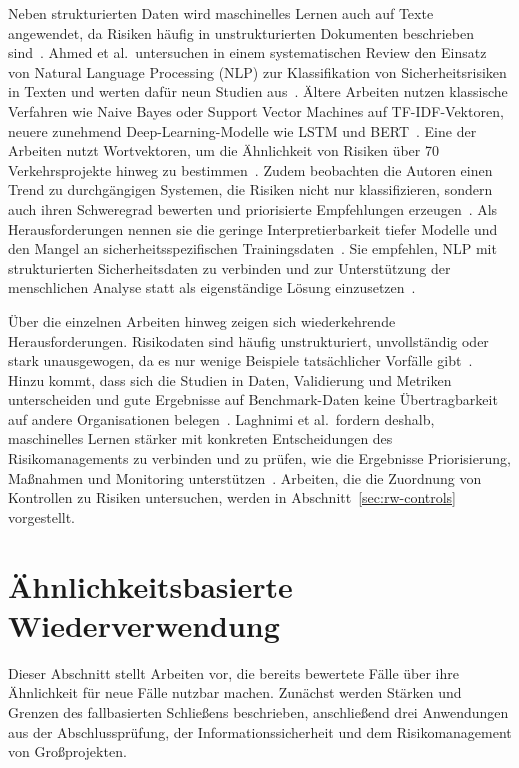 Neben strukturierten Daten wird maschinelles Lernen auch auf Texte angewendet, da Risiken häufig in unstrukturierten Dokumenten beschrieben sind~\cite[S.~1706]{Ahmed2026}.
Ahmed et al.\ untersuchen in einem systematischen Review den Einsatz von Natural Language Processing (NLP) zur Klassifikation von Sicherheitsrisiken in Texten und werten dafür neun Studien aus~\cite[S.~1705, 1711]{Ahmed2026}.
Ältere Arbeiten nutzen klassische Verfahren wie Naive Bayes oder Support Vector Machines auf TF-IDF-Vektoren, neuere zunehmend Deep-Learning-Modelle wie LSTM und BERT~\cite[S.~1709--1710]{Ahmed2026}.
Eine der Arbeiten nutzt Wortvektoren, um die Ähnlichkeit von Risiken über 70 Verkehrsprojekte hinweg zu bestimmen~\cite[S.~1709]{Ahmed2026}.
Zudem beobachten die Autoren einen Trend zu durchgängigen Systemen, die Risiken nicht nur klassifizieren, sondern auch ihren Schweregrad bewerten und priorisierte Empfehlungen erzeugen~\cite[S.~1710]{Ahmed2026}.
Als Herausforderungen nennen sie die geringe Interpretierbarkeit tiefer Modelle und den Mangel an sicherheitsspezifischen Trainingsdaten~\cite[S.~1711]{Ahmed2026}.
Sie empfehlen, NLP mit strukturierten Sicherheitsdaten zu verbinden und zur Unterstützung der menschlichen Analyse statt als eigenständige Lösung einzusetzen~\cite[S.~1711]{Ahmed2026}.

Über die einzelnen Arbeiten hinweg zeigen sich wiederkehrende Herausforderungen.
Risikodaten sind häufig unstrukturiert, unvollständig oder stark unausgewogen, da es nur wenige Beispiele tatsächlicher Vorfälle gibt~\cite[S.~5]{Laghnimi2026}.
Hinzu kommt, dass sich die Studien in Daten, Validierung und Metriken unterscheiden und gute Ergebnisse auf Benchmark-Daten keine Übertragbarkeit auf andere Organisationen belegen~\cite[S.~9--10]{Laghnimi2026}.
Laghnimi et al.\ fordern deshalb, maschinelles Lernen stärker mit konkreten Entscheidungen des Risikomanagements zu verbinden und zu prüfen, wie die Ergebnisse Priorisierung, Maßnahmen und Monitoring unterstützen~\cite[S.~10]{Laghnimi2026}.
Arbeiten, die die Zuordnung von Kontrollen zu Risiken untersuchen, werden in Abschnitt~\ref{sec:rw-controls} vorgestellt.

\section{Ähnlichkeitsbasierte Wiederverwendung}\label{sec:rw-reuse}
Dieser Abschnitt stellt Arbeiten vor, die bereits bewertete Fälle über ihre Ähnlichkeit für neue Fälle nutzbar machen.
Zunächst werden Stärken und Grenzen des fallbasierten Schließens beschrieben, anschließend drei Anwendungen aus der Abschlussprüfung, der Informationssicherheit und dem Risikomanagement von Großprojekten.

